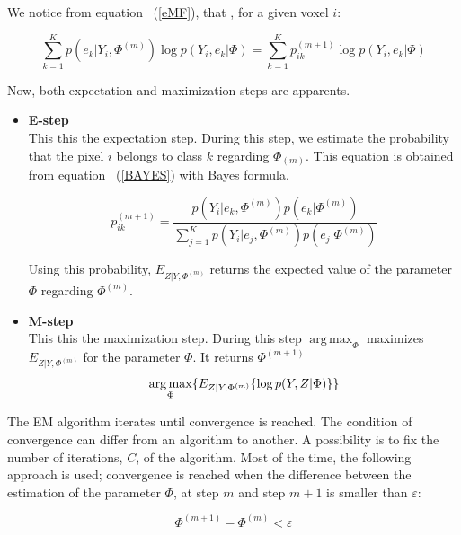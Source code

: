 We notice from equation ~(\ref{eMF}), that , for a given voxel $i$:

  \begin{equation}\label{BAYES}
  \sum_{k=1}^K   p(e_{k}|Y_i,\Phi^{(m)})\operatorname*{log} p(Y_i,e_{k}|\Phi) = \sum_{k=1}^K   p_{ik}^{(m+1)}\operatorname*{log} p(Y_i,e_{k}|\Phi)
  \end{equation}

Now, both expectation and maximization steps are apparents.\\
\begin{itemize}
\item \textbf{E-step}\\
This this the expectation step. During this step, we estimate the probability that the pixel $i$ belongs to class $k$ regarding $\Phi_{(m)}$. This equation is obtained from equation ~(\ref{BAYES}) with Bayes formula.

  \begin{equation}\label{ESTEP1}
  p_{ik}^{(m+1)} = \frac{p(Y_i|e_k,\Phi^{(m)})p(e_k|\Phi^{(m)})}{\sum_{j=1}^K   p(Y_i|e_j,\Phi^{(m)}) p(e_{j}|\Phi^{(m)})}  
  \end{equation}

Using this probability, $E_{Z|Y,\Phi^{(m)}}$ returns the expected value of the parameter $\Phi$ regarding $\Phi^{(m)}$.\\


\item \textbf{M-step}\\
This this the maximization step. During this step $\operatorname*{arg\,max}_\Phi$ maximizes $E_{Z|Y,\Phi^{(m)}}$ for the parameter $\Phi$. It returns $\Phi^{(m+1)}$
  \begin{equation}
  \operatorname*{arg\,max}_\Phi \{ E_{Z|Y,\Phi^{(m)}} \{\operatorname*{log} p(Y,Z|\Phi)\}\}\\
  \end{equation}
 
\end{itemize} 
  
The EM algorithm iterates until convergence is reached. The condition of convergence can differ from an algorithm to another. A possibility is to fix the number of iterations, $C$, of the algorithm. Most of the time, the following approach is used; convergence is reached when the difference between the estimation of the parameter $\Phi$, at step $m$ and step $m+1$ is smaller than $\varepsilon$:

  \begin{equation*}
  \Phi^{(m+1)}-\Phi^{(m)} < \varepsilon
  \end{equation*}

